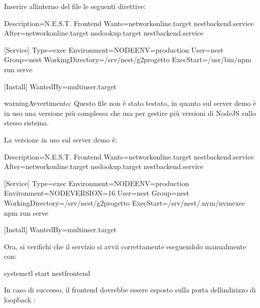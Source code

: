 \documentclass[letterpaper,10pt,italian]{sphinxmanual}
\begin{document}
\sphinxAtStartPar
Inserire all\textquotesingle{}interno del file le seguenti direttive:

\begin{sphinxVerbatim}[commandchars=\\\{\}]
[Unit]
Description=N.E.S.T. Frontend
Wants=network\PYGZhy{}online.target nest\PYGZhy{}backend.service
After=network\PYGZhy{}online.target nss\PYGZhy{}lookup.target nest\PYGZhy{}backend.service

[Service]
Type=exec
Environment=NODE\PYGZus{}ENV=production
User=nest
Group=nest
WorkingDirectory=/srv/nest/g2\PYGZhy{}progetto
ExecStart=/usr/bin/npm run serve

[Install]
WantedBy=multi\PYGZhy{}user.target
\end{sphinxVerbatim}

\begin{sphinxadmonition}{warning}{Avvertimento:}
\sphinxAtStartPar
Questo file non è stato testato, in quanto sul server demo è in uso una versione più complessa che usa
 per gestire più versioni di NodeJS sullo stesso sistema.

\sphinxAtStartPar
La versione in uso sul server demo è:

\begin{sphinxVerbatim}[commandchars=\\\{\}]
[Unit]
Description=N.E.S.T. Frontend
Wants=network\PYGZhy{}online.target nest\PYGZhy{}backend.service
After=network\PYGZhy{}online.target nss\PYGZhy{}lookup.target nest\PYGZhy{}backend.service

[Service]
Type=exec
Environment=NODE\PYGZus{}ENV=production
Environment=NODE\PYGZus{}VERSION=16
User=nest
Group=nest
WorkingDirectory=/srv/nest/g2\PYGZhy{}progetto
ExecStart=/srv/nest/.nvm/nvm\PYGZhy{}exec npm run serve

[Install]
WantedBy=multi\PYGZhy{}user.target
\end{sphinxVerbatim}
\end{sphinxadmonition}

\sphinxAtStartPar
Ora, si verifichi che il servizio si avvii correttamente eseguendolo manualmente con:

\begin{sphinxVerbatim}[commandchars=\\\{\}]
systemctl start nest\PYGZhy{}frontend
\end{sphinxVerbatim}

\sphinxAtStartPar
In caso di successo, il frontend dovrebbe essere esposto sulla porta  dell\textquotesingle{}indirizzo di loopback :
\end{document}
